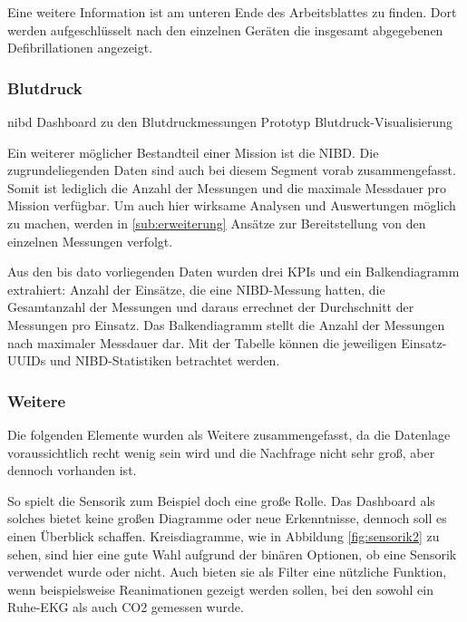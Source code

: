 Eine weitere Information ist am unteren Ende des Arbeitsblattes zu finden.
Dort werden aufgeschlüsselt nach den einzelnen Geräten die insgesamt abgegebenen Defibrillationen angezeigt.

\subsubsection{Blutdruck}
\label{subsub:nibd}
\bildbreit
{nibd}
{Dashboard zu den Blutdruckmessungen}
{Prototyp Blutdruck-Visualisierung}

Ein weiterer möglicher Bestandteil einer Mission ist die \gls{NIBD}.
Die zugrundeliegenden Daten sind auch bei diesem Segment vorab zusammengefasst.
Somit ist lediglich die Anzahl der Messungen und die maximale Messdauer pro Mission verfügbar.
Um auch hier wirksame Analysen und Auswertungen möglich zu machen, werden in \ref{sub:erweiterung} Ansätze zur Bereitstellung von den einzelnen Messungen verfolgt.

Aus den bis dato vorliegenden Daten wurden drei \gls{KPI}s und ein Balkendiagramm extrahiert:
Anzahl der Einsätze, die eine \gls{NIBD}-Messung hatten, die Gesamtanzahl der Messungen und daraus errechnet der Durchschnitt der Messungen pro Einsatz.
Das Balkendiagramm stellt die Anzahl der Messungen nach maximaler Messdauer dar.
Mit der Tabelle können die jeweiligen Einsatz-UUIDs und \gls{NIBD}-Statistiken betrachtet werden. 



\subsubsection{Weitere}
\label{subsub:weitere}
Die folgenden Elemente wurden als \glqq Weitere\grqq{} zusammengefasst, da die Datenlage voraussichtlich recht wenig sein wird und die Nachfrage nicht sehr groß, aber dennoch vorhanden ist.


So spielt die Sensorik zum Beispiel doch eine große Rolle. 
Das Dashboard als solches bietet keine großen Diagramme oder neue Erkenntnisse, dennoch soll es einen Überblick schaffen.
Kreisdiagramme, wie in Abbildung \ref{fig:sensorik2} zu sehen, sind hier eine gute Wahl aufgrund der binären Optionen, ob eine Sensorik verwendet wurde oder nicht.
Auch bieten sie als Filter eine nützliche Funktion, wenn beispielsweise Reanimationen gezeigt werden sollen, bei den sowohl ein Ruhe-EKG als auch CO2 gemessen wurde.

